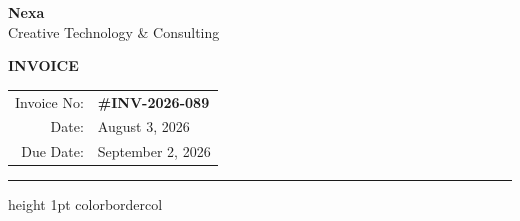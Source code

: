 \documentclass[10pt]{article}
\begin{document}
\setlength{\parindent}{0pt}
\color{darktext}

\begin{minipage}[t]{0.5\textwidth}
    \hspace{0.2cm}
    \begin{minipage}[b]{0.8\textwidth}
        {\Huge\bfseries\color{primary} Nexa} \\[0.1cm]
        {\small\color{mutedtext} Creative Technology \& Consulting}
    \end{minipage}
\end{minipage}%
\begin{minipage}[t]{0.5\textwidth}
    \raggedleft
    {\Huge\bfseries\color{primary} INVOICE} \\[0.2cm]
    \begin{tabular}{rl}
        \textcolor{mutedtext}{Invoice No:} & \textbf{\#INV-2026-089} \\
        \textcolor{mutedtext}{Date:}       & August 3, 2026 \\
        \textcolor{mutedtext}{Due Date:}   & September 2, 2026 \\
    \end{tabular}
\end{minipage}

\vspace{0.5cm}
\hrule height 1pt color{bordercol}
\vspace{0.4cm}
\end{document}
